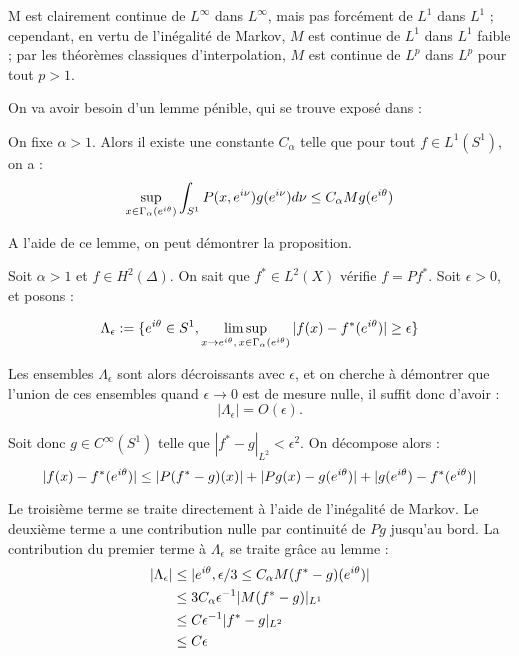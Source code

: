 M est clairement continue de $L^{\infty}$ dans $L^{\infty}$, mais pas forcément de $L^1$ dans $L^1$ ; cependant, en vertu de l'inégalité de Markov, $M$ est continue de $L^1$ dans $L^1$ faible ; par les théorèmes classiques d'interpolation, $M$ est continue de $L^p$ dans $L^p$ pour tout $p>1$.

On va avoir besoin d'un lemme pénible, qui se trouve exposé dans \cite{stein1972boundary} :

\begin{lem}
On fixe $\alpha > 1$. Alors il existe une constante $C_{\alpha}$ telle que pour tout $f \in L^1(S^1)$, on a :
\begin{equation*}
	\sup_{x \in \Gamma_{\alpha}(e^{i\theta})}\int_{S^1}P(x,e^{i\nu})g(e^{i\nu})d\nu \leq C_{\alpha}Mg(e^{i\theta})
\end{equation*}
\end{lem}

A l'aide de ce lemme, on peut démontrer la proposition. 

Soit $\alpha > 1$ et $f \in H^2(\Delta)$. On sait que $f^* \in L^2(X)$ vérifie $f=Pf^*$. Soit $\epsilon > 0$, et posons :

\begin{equation*}
	\Lambda_{\epsilon} := \{e^{i\theta} \in S^1, \limsup_{x \to e^{i\theta}, \,x \in \Gamma_{\alpha}(e^{i\theta})}|f(x)-f^*(e^{i\theta})| \geq \epsilon\}
\end{equation*}

Les ensembles $\Lambda_{\epsilon}$ sont alors décroissants avec $\epsilon$, et on cherche à démontrer que l'union de ces ensembles quand $\epsilon \to 0$ est de mesure nulle, il suffit donc d'avoir :
\begin{equation*}
	|\Lambda_{\epsilon}| = O(\epsilon).
\end{equation*}

Soit donc $g \in C^{\infty}(S^1)$ telle que $|f^*-g|_{L^2} < \epsilon^2$. On décompose alors :
\begin{equation*}
	|f(x)-f^*(e^{i\theta})| \leq |P(f^*-g)(x)| + |Pg(x)-g(e^{i\theta})| + |g(e^{i\theta})-f^*(e^{i\theta})|
\end{equation*}

Le troisième terme se traite directement à l'aide de l'inégalité de Markov. Le deuxième terme a une contribution nulle par continuité de $Pg$ jusqu'au bord. La contribution du premier terme à $\Lambda_{\epsilon}$ se traite grâce au lemme :
\begin{align*}
	|\Lambda_{\epsilon}| &\leq |e^{i\theta}, \epsilon/3 \leq C_{\alpha} M(f^*-g)(e^{i\theta})| \\
		& \leq 3C_{\alpha}\epsilon^{-1} |M(f^*-g)|_{L^1} \\
		& \leq C \epsilon^{-1} |f^*-g|_{L^2} \\
		& \leq C \epsilon
\end{align*}

